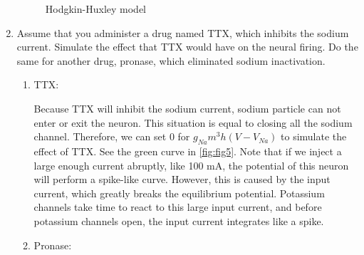 \documentclass[11pt]{article}
\begin{document}
\begin{enumerate}
		\begin{figure}[ht]
			\centering
			\caption{Hodgkin-Huxley model}
		\end{figure}
		
		\item Assume that you administer a drug named TTX, which inhibits the sodium current. Simulate the effect that TTX would have on the neural firing. Do the same for another drug, pronase, which eliminated sodium inactivation.
		
		\begin{enumerate}
		    \item TTX:
		
    		Because TTX will inhibit the sodium current, sodium particle can not enter or exit the neuron. This situation is equal to closing all the sodium channel. Therefore, we can set 0 for $g_{Na}m^3h(V-V_{Na})$ to simulate the effect of TTX. See the green curve in \ref{fig:fig5}. Note that if we inject a large enough current abruptly, like 100 mA, the potential of this neuron will perform a spike-like curve. However, this is caused by the input current, which greatly breaks the equilibrium potential. Potassium channels take time to react to this large input current, and before potassium channels open, the input current integrates like a spike.
    		
    		\item Pronase:
		

\end{enumerate}
\end{enumerate}
\end{document}
